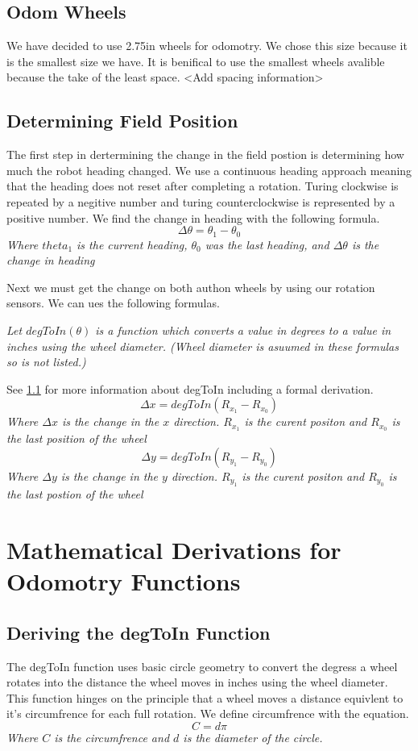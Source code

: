 \documentclass[12pt]{article}
\begin{document}
\subsection{Odom Wheels}
We have decided to use 2.75in wheels for odomotry. We chose this size because it is the smallest size we have. It is benifical to use the smallest wheels avalible because the take of the least space. <Add spacing information>

\pagebreak
\subsection{Determining Field Position}
The first step in dertermining the change in the field postion is determining how much the robot heading changed. We use a continuous heading approach meaning that the heading does not reset after completing a rotation. Turing clockwise is repeated by a negitive number and turing counterclockwise is represented by a positive number. We find the change in heading with the following formula.
$$
    \Delta \theta = \theta_1-\theta_0
$$
\textit{Where $theta_1$ is the current heading, $\theta_0$ was the last heading, and $\Delta \theta$ is the change in heading}

Next we must get the change on both authon wheels by using our rotation sensors. We can ues the following formulas.

\textit{Let $degToIn(\theta)$ is a function which converts a value in degrees to a value in inches using the wheel diameter. (Wheel diameter is asuumed in these formulas so is not listed.)}

See \ref{app_degToIn} for more information about degToIn including a formal derivation.
$$
    \Delta x = degToIn(R_{x_1} - R_{x_0})
$$
\textit{Where $\Delta x$ is the change in the $x$ direction. $R_{x_1}$ is the curent positon and $R_{x_0}$ is the last position of the wheel}
$$
    \Delta y = degToIn(R_{y_1} - R_{y_0})
$$
\textit{Where $\Delta y$ is the change in the $y$ direction. $R_{y_1}$ is the curent positon and $R_{y_0}$ is the last postion of the wheel}

\newpage
\appendix
\section{Mathematical Derivations for Odomotry Functions}
\subsection{Deriving the degToIn Function} \label{app_degToIn}
    The degToIn function uses basic circle geometry to convert the degress a wheel rotates into the distance the wheel moves in inches using the wheel diameter. This function hinges on the principle that a wheel moves a distance equivlent to it's circumfrence for each full rotation. We define circumfrence with the equation.
    $$ C = d\pi $$
    \center\textit{Where $C$ is the circumfrence and $d$ is the diameter of the circle.}
\end{document}
